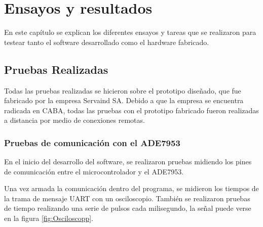 
\chapter{Ensayos y resultados} %
\label{Chapter4} %

En este capítulo se explican los diferentes ensayos y tareas que se realizaron para testear tanto el software desarrollado como el hardware fabricado.


\section{Pruebas Realizadas}
\label{sec:pruebasHW}

Todas las pruebas realizadas se hicieron sobre el prototipo diseñado, que fue fabricado por la empresa Servaind SA. Debido a que la empresa se encuentra radicada en CABA, todas las pruebas con el prototipo fabricado fueron realizadas a distancia por medio de conexiones remotas.

\subsection{Pruebas de comunicación con el ADE7953}
En el inicio del desarrollo del software, se realizaron pruebas midiendo los pines de comunicación entre el microcontrolador y el ADE7953.

Una vez armada la comunicación dentro del programa, se midieron los tiempos de la trama de mensaje UART con un osciloscopio. También se realizaron pruebas de tiempo realizando una serie de pulsos cada milisegundo, la señal puede verse en la figura \ref{fig:Osciloscopp}.




